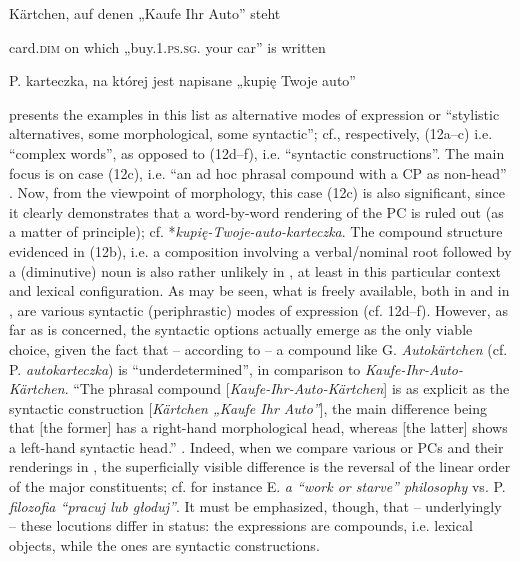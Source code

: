 \documentclass[output=paper]{LSP/langsci}
\begin{document}
\ex  Kärtchen, auf denen „Kaufe Ihr Auto” steht

card.\textsc{dim} on which „buy.\textsc{1.ps.sg.} your car” is written

 {P. karteczka, na której jest napisane „kupię Twoje auto”}
\z
\z

{\citet[250]{Meibauer2007} presents the  examples in this list as alternative modes of expression or “stylistic alternatives, some morphological, some syntactic”; cf., respectively, (12a–c) i.e. “complex words”, as opposed to (12d–f), i.e. “syntactic constructions”. The main focus is on case (12c), i.e. “an ad hoc phrasal compound with a CP as non-head” \citep[249]{Meibauer2007}. Now, from the viewpoint of  morphology, this case (12c) is also significant, since it clearly demonstrates that a word-by-word rendering of the  PC is ruled out (as a matter of principle); cf. *}{\textit{kupię-Twoje-auto-karteczka}}{. The compound structure evidenced in (12b), i.e. a composition involving a verbal/nominal root followed by a (diminutive) noun is also rather unlikely in , at least in this particular context and lexical configuration. As may be seen, what is freely available, both in  and in , are various syntactic (periphrastic) modes of expression (cf. 12d–f). However, as far as  is concerned, the syntactic options actually emerge as the only viable choice, given the fact that – according to \citet[250]{Meibauer2007} – a compound like G.} {\textit{Autokärtchen}} {(cf. P.} {\textit{autokarteczka}}{) is “underdetermined”, in comparison to} {\textit{Kaufe-Ihr-Auto-Kärtchen}}{. “The phrasal compound [}{\textit{Kaufe-Ihr-Auto-Kärtchen}}{] is as explicit as the syntactic construction [}{\textit{Kärtchen „Kaufe Ihr Auto”}}{], the main difference being that [the former] has a right-hand morphological head, whereas [the latter] shows a left-hand syntactic head.” \citep[250]{Meibauer2007}. Indeed, when we compare various  or  PCs and their renderings in , the superficially visible difference is the reversal of the} {linear order of the major constituents; cf. for instance E.} {\textit{a “work or starve” philosophy}} {vs. P.} {\textit{filozofia “pracuj lub głoduj”}}{. It must be emphasized, though, that – underlyingly – these locutions differ in  status: the  expressions are compounds, i.e. lexical objects, while the  ones are syntactic constructions.}
\end{document}
